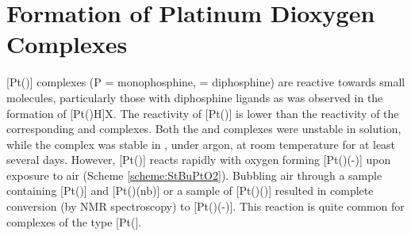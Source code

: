 

 
\section{Formation of Platinum Dioxygen Complexes}
\label{section:PtO2}

[Pt()] complexes (P = monophosphine,  = diphosphine) are reactive towards small molecules, particularly those with diphosphine ligands as was observed in the formation of [Pt(\tBuxantphos)H]X.\cite{Hackett1988} The reactivity of [Pt(\tButhixantphos)] is lower than the reactivity of the corresponding \tBusixantphos{} and \tBuxantphos{} complexes.  Both the \tBusixantphos{} and \tBuxantphos{} complexes were unstable in solution, while the \tButhixantphos{} complex was stable in , under argon, at room temperature for at least several days.  However, [Pt(\tButhixantphos)] reacts rapidly with oxygen forming [Pt(\tButhixantphos)(-)] upon exposure to air (Scheme \ref{scheme:StBuPtO2}).  Bubbling air through a sample containing [Pt(\tButhixantphos)] and [Pt(\tButhixantphos)(nb)] or a sample of [Pt(\tButhixantphos)()] resulted in complete conversion (by \phosphorus{} NMR spectroscopy) to [Pt(\tButhixantphos)(-)].  This reaction is quite common for complexes of the type [Pt(].\cite{Goel1983b, Yoshida1977}


